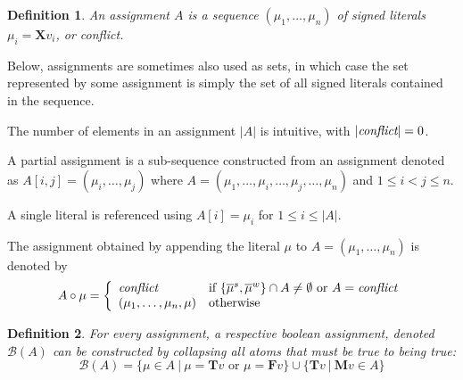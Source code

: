 \documentclass{vutinfth} %
\newtheorem{definition}{Definition}[section]
\newtheorem*{remark}{Remark}
\newcommand{\negstrong}[1]{\overline{#1}^s}
\newcommand{\negweak}[1]{\overline{#1}^w}
\newcommand{\bass}{\mathcal{B}}
\newcommand{\ass}{A}
\newcommand{\bT}{\mathbf{T}}
\newcommand{\bM}{\mathbf{M}}
\newcommand{\bF}{\mathbf{F}}
\newcommand{\bX}{\mathbf{X}}
\newcommand{\sgl}{\mu}
\begin{document}
\begin{definition}
An \emph{assignment} $\ass$ is a sequence $(\sgl_1, \ldots, \sgl_n)$ of signed literals $\sgl_i = \bX v_i$, or \emph{conflict}.
\end{definition}

Below, assignments are sometimes also used as sets, in which case the set represented by some assignment is simply the set of all signed literals contained in the sequence.

The number of elements in an assignment $|\ass|$ is intuitive, with $|\emph{conflict}| = 0$.

A partial assignment is a sub-sequence constructed from an assignment denoted as $\ass[i,j] = (\sgl_i, \ldots, \sgl_j)$ where $\ass = (\sgl_1, \ldots, \sgl_i, \ldots, \sgl_j, \ldots, \sgl_n)$ and $1 \leq i < j \leq n$.

A single literal is referenced using $A[i] = \sgl_i$ for $1 \leq i \leq |A|$.

The assignment obtained by appending the literal $\sgl$ to $\ass = (\sgl_1, \ldots, \sgl_n)$ is denoted by $$\ass \circ \sgl = \left\{\begin{array}{ll}
        
        \emph{conflict} & \text{if } \{ \negstrong{\sgl}, \negweak{\sgl} \} \cap \ass \not = \emptyset \text{ or } \ass = \emph{conflict}\\
        (\sgl_1, \ldots, \sgl_{n}, \sgl) & \text{otherwise} \\
        \end{array}\right.$$



\begin{definition}
For every assignment, a respective \emph{boolean assignment}, denoted $\bass(\ass)$ can be constructed by collapsing all atoms that \emph{must be true} to being \emph{true}:$$\bass(\ass) = \{ \sgl \in \ass \ | \ \sgl = \bT v \textrm{ or } \sgl = \bF v \} \cup \{ \bT v \ | \ \bM v \in \ass \}$$
\end{definition}
\end{document}
